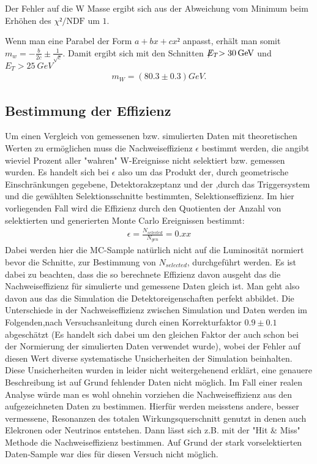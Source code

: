 \documentclass[a4paper,12pt]{article}
\newcommand{\met}{\ensuremath{\not\mathrel{E}}_T}
\begin{document}
Der Fehler auf die W Masse ergibt sich aus der Abweichung vom Minimum beim Erhöhen des
$χ²/\text{NDF}$ um $1$.

Wenn man eine Parabel der Form $a + bx + cx²$ anpasst, erhält man somit $m_w = -\frac{b}{2c} ±
\frac{1}{\sqrt{c}}$.
Damit ergibt sich mit den Schnitten $\met > \SI{30}{GeV}$ und $E_{T} > \SI{25}{GeV}$
\begin{align*}
	m_W =  ( 80.3 ± 0.3 ) \si{GeV}.
\end{align*}


\subsection{Bestimmung der Effizienz}
\label{effizienz}
Um einen Vergleich von gemessenen bzw. simulierten Daten mit theoretischen Werten zu ermöglichen muss die Nachweiseffizienz
$\epsilon$ bestimmt werden, die angibt wieviel Prozent aller "wahren" W-Ereignisse nicht selektiert bzw. gemessen wurden.
Es handelt sich bei $\epsilon$ also um das Produkt der, durch geometrische Einschränkungen gegebene, Detektorakzeptanz und der
,durch das Triggersystem und die gewählten Selektionsschnitte bestimmten, Selektionseffizienz. Im hier vorliegenden Fall wird die
Effizienz durch den Quotienten der Anzahl von selektierten und generierten Monte Carlo Ereignissen bestimmt:
\begin{align*}
	\epsilon = \frac{N_{selected}}{N_{gen}} = 0.xx
\end{align*}
Dabei werden hier die MC-Sample natürlich nicht auf die Luminosität normiert bevor die Schnitte, zur Bestimmung von $N_{selected}$, durchgeführt
werden.   
Es ist dabei zu beachten, dass die so berechnete Effizienz davon ausgeht das die Nachweiseffizienz für simulierte und gemessene
Daten gleich ist. Man geht also davon aus das die Simulation die Detektoreigenschaften perfekt abbildet. Die Unterschiede in der
Nachweiseffizienz zwischen Simulation und Daten werden im Folgenden,nach Versuchsanleitung \cite{versuchsanleitung} durch einen 
Korrekturfaktor $0.9\pm0.1$ abgeschätzt (Es handelt sich dabei um den gleichen Faktor der auch schon bei der Normierung der simulierten Daten 
verwendet wurde), wobei der Fehler auf diesen Wert diverse systematische Unsicherheiten der Simulation
beinhalten. Diese Unsicherheiten wurden in \cite{versuchsanleitung} leider nicht weitergehenend erklärt, eine genauere Beschreibung
ist auf Grund fehlender Daten nicht möglich. Im Fall einer realen Analyse würde man es wohl ohnehin vorziehen die Nachweiseffizienz aus
den aufgezeichneten Daten zu bestimmen. Hierfür werden meisstens andere, besser vermessene, Resonanzen des totalen Wirkungsquerschnitt genutzt 
in denen auch Elekronen oder Neutrinos entstehen. Dann lässt sich z.B. mit der "Hit & Miss" Methode die Nachweiseffizienz bestimmen. Auf Grund
der stark vorselektierten Daten-Sample war dies für diesen Versuch nicht möglich.
\end{document}
